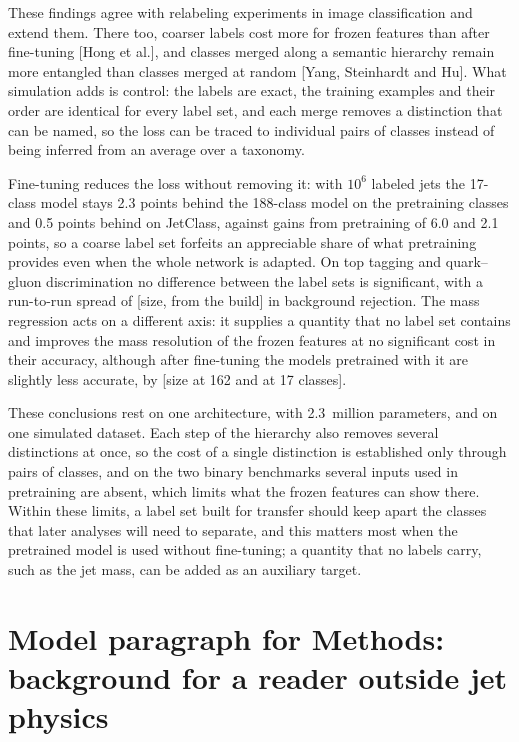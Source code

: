 \documentclass[11pt,a4paper]{article}
\newcommand{\bn}[1]{\textcolor{blue!70!black}{#1}}
\newcommand{\ct}[1]{\textcolor{black!55}{[#1]}}
\newcommand{\chk}[1]{\textcolor{red!70!black}{#1}}
\begin{document}
These findings agree with relabeling experiments in image classification and extend them.
There too, coarser labels cost more for frozen features than after fine-tuning \ct{Hong et al.},
\chk{and classes merged along a semantic hierarchy remain more entangled than classes merged at
random} \ct{\chk{Yang, Steinhardt and Hu}}.
What simulation adds is control: the labels are exact, the training examples and their order are identical for every label set,
and each merge removes a distinction that can be named, so the loss can be traced to individual
pairs of classes instead of being inferred from an average over a taxonomy.

Fine-tuning reduces the loss without removing it: with $10^6$ labeled jets the 17-class model
stays \bn{2.3} points behind the 188-class model on
the pretraining classes and \bn{0.5} points behind on JetClass, against gains from pretraining of
\bn{6.0} and \bn{2.1} points, so a coarse label set forfeits an appreciable share of what pretraining
provides even when the whole network is adapted.
On top tagging and quark--gluon discrimination no difference between the label sets is
significant, with a run-to-run spread of \chk{[size, from the build]} in background rejection.
The mass regression acts on a different axis: it supplies a quantity that no label set contains
and improves the mass resolution of the frozen features at no significant cost in their accuracy,
although after fine-tuning the models pretrained with it are slightly less accurate, by
\chk{[size at 162 and at 17 classes]}.

These conclusions rest on one architecture, with 2.3~million parameters, and on one simulated
dataset.
Each step of the hierarchy also removes several distinctions at once, so the cost of a single
distinction is established only through pairs of classes, and on the two binary benchmarks several
inputs used in pretraining are absent, which limits what the frozen features can show there.
Within these limits, a label set built for transfer should keep apart the classes that later
analyses will need to separate, and this matters most when the pretrained model is used without
fine-tuning; a quantity that no labels carry, such as the jet mass, can be added as an auxiliary
target.

\section*{Model paragraph for Methods: background for a reader outside jet physics}
\end{document}

